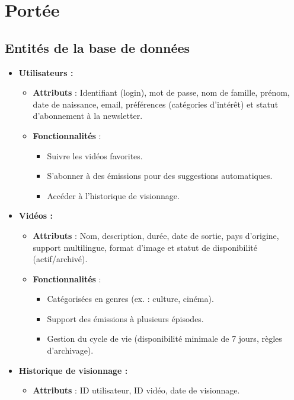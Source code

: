 \documentclass[a4paper, 12pt]{article}
\begin{document}
\section*{Portée}

\subsection*{Entités de la base de données}

\begin{itemize}
    \item \textbf{Utilisateurs :}
    \begin{itemize}
        \item \textbf{Attributs} : Identifiant (login), mot de passe, nom de famille, prénom, date de naissance, email, préférences (catégories d'intérêt) et statut d'abonnement à la newsletter.
        \item \textbf{Fonctionnalités} :
        \begin{itemize}
            \item Suivre les vidéos favorites.
            \item S'abonner à des émissions pour des suggestions automatiques.
            \item Accéder à l'historique de visionnage.
        \end{itemize}
    \end{itemize}
    \item \textbf{Vidéos :}
    \begin{itemize}
        \item \textbf{Attributs} : Nom, description, durée, date de sortie, pays d'origine, support multilingue, format d'image et statut de disponibilité (actif/archivé).
        \item \textbf{Fonctionnalités} :
        \begin{itemize}
            \item Catégorisées en genres (ex. : culture, cinéma).
            \item Support des émissions à plusieurs épisodes.
            \item Gestion du cycle de vie (disponibilité minimale de 7 jours, règles d'archivage).
        \end{itemize}
    \end{itemize}
    \item \textbf{Historique de visionnage :}
    \begin{itemize}
        \item \textbf{Attributs} : ID utilisateur, ID vidéo, date de visionnage.

\end{itemize}
\end{itemize}
\end{document}
